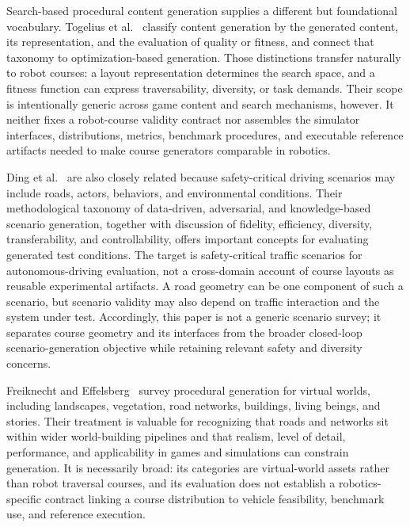 Search-based procedural content generation supplies a different but foundational
vocabulary. Togelius et al.\ \cite{Togelius2011SearchBased} classify content
generation by the generated content, its representation, and the evaluation of
quality or fitness, and connect that taxonomy to optimization-based generation.
Those distinctions transfer naturally to robot courses: a layout representation
determines the search space, and a fitness function can express traversability,
diversity, or task demands. Their scope is intentionally generic across game
content and search mechanisms, however. It neither fixes a robot-course validity
contract nor assembles the simulator interfaces, distributions, metrics,
benchmark procedures, and executable reference artifacts needed to make course
generators comparable in robotics.

Ding et al.\ \cite{Ding2023SafetyCritical} are also closely related because
safety-critical driving scenarios may include roads, actors, behaviors, and
environmental conditions. Their methodological taxonomy of data-driven,
adversarial, and knowledge-based scenario generation, together with discussion
of fidelity, efficiency, diversity, transferability, and controllability, offers
important concepts for evaluating generated test conditions. The target is
safety-critical traffic scenarios for autonomous-driving evaluation, not a
cross-domain account of course layouts as reusable experimental artifacts. A
road geometry can be one component of such a scenario, but scenario validity may
also depend on traffic interaction and the system under test. Accordingly, this
paper is not a generic scenario survey; it separates course geometry and its
interfaces from the broader closed-loop scenario-generation objective while
retaining relevant safety and diversity concerns.

Freiknecht and Effelsberg\ \cite{Freiknecht2017SurveyVirtualWorlds} survey
procedural generation for virtual worlds, including landscapes, vegetation, road
networks, buildings, living beings, and stories. Their treatment is valuable for
recognizing that roads and networks sit within wider world-building pipelines and
that realism, level of detail, performance, and applicability in games and
simulations can constrain generation. It is necessarily broad: its categories
are virtual-world assets rather than robot traversal courses, and its evaluation
does not establish a robotics-specific contract linking a course distribution to
vehicle feasibility, benchmark use, and reference execution.

